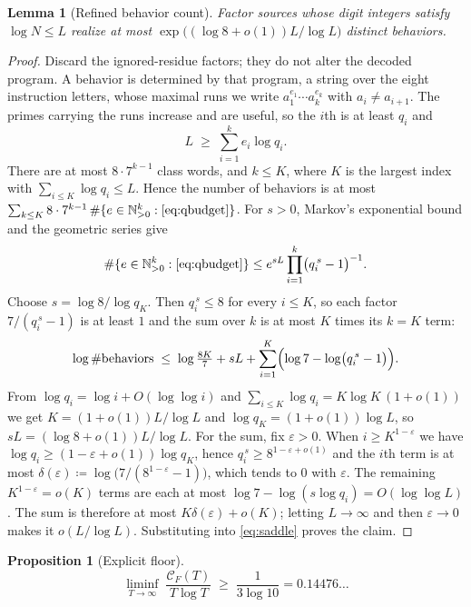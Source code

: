 \documentclass[11pt]{article}
\newtheorem{lemma}[theorem]{Lemma}
\newtheorem{proposition}[theorem]{Proposition}
\theoremstyle{remark}
\newcommand{\N}{\mathbb N}
\newcommand{\CF}{\mathcal C_F}
\begin{document}
\begin{lemma}[Refined behavior count]\label{lem:count8}
Factor sources whose digit integers satisfy $\log N\le L$ realize at most
$\exp\bigl((\log8+o(1))L/\log L\bigr)$ distinct behaviors.
\end{lemma}

\begin{proof}
Discard the ignored-residue factors; they do not alter the decoded program.
A behavior is determined by that program, a string over the eight instruction
letters, whose maximal runs we write $a_1^{e_1}\cdots a_k^{e_k}$ with
$a_i\ne a_{i+1}$.  The primes carrying the runs increase and are useful, so
the $i$th is at least $q_i$ and
\begin{equation}\label{eq:qbudget}
  L\;\ge\;\sum_{i=1}^{k}e_i\log q_i .
\end{equation}
There are at most $8\cdot7^{k-1}$ class words, and $k\le K$, where $K$ is
the largest index with $\sum_{i\le K}\log q_i\le L$.  Hence the number of
behaviors is at most
$\sum_{k\le K}8\cdot7^{k-1}\,\#\{e\in\N_{>0}^k:\eqref{eq:qbudget}\}$.
For $s>0$, Markov's exponential bound and the geometric series give
\[
  \#\{e\in\N_{>0}^k:\eqref{eq:qbudget}\}
  \le e^{sL}\prod_{i=1}^{k}\bigl(q_i^{\,s}-1\bigr)^{-1}.
\]
Choose $s=\log8/\log q_K$.  Then $q_i^{\,s}\le8$ for every $i\le K$, so each
factor $7/(q_i^{\,s}-1)$ is at least $1$ and the sum over $k$ is at most $K$
times its $k=K$ term:
\begin{equation}\label{eq:saddle}
  \log\#\text{behaviors}
  \;\le\;\log\tfrac{8K}{7}+sL
      +\sum_{i=1}^{K}\Bigl(\log7-\log\bigl(q_i^{\,s}-1\bigr)\Bigr).
\end{equation}
From $\log q_i=\log i+O(\log\log i)$ and
$\sum_{i\le K}\log q_i=K\log K\,(1+o(1))$ we get $K=(1+o(1))L/\log L$ and
$\log q_K=(1+o(1))\log L$, so $sL=(\log8+o(1))L/\log L$.  For the sum, fix
$\varepsilon>0$.  When $i\ge K^{1-\varepsilon}$ we have
$\log q_i\ge(1-\varepsilon+o(1))\log q_K$, hence
$q_i^{\,s}\ge8^{1-\varepsilon+o(1)}$ and the $i$th term is at most
$\delta(\varepsilon)\coloneqq\log\bigl(7/(8^{1-\varepsilon}-1)\bigr)$, which tends
to $0$ with $\varepsilon$.  The remaining $K^{1-\varepsilon}=o(K)$ terms are
each at most $\log7-\log(s\log q_i)=O(\log\log L)$.  The sum is therefore at
most $K\delta(\varepsilon)+o(K)$; letting $L\to\infty$ and then
$\varepsilon\to0$ makes it $o(L/\log L)$.  Substituting into
\eqref{eq:saddle} proves the claim.
\end{proof}

\begin{proposition}[Explicit floor]\label{prop:floor}
\[
  \liminf_{T\to\infty}\;\frac{\CF(T)}{T\log T}
  \;\ge\;\frac{1}{3\log10}=0.14476\ldots
\]
\end{proposition}
\end{document}
